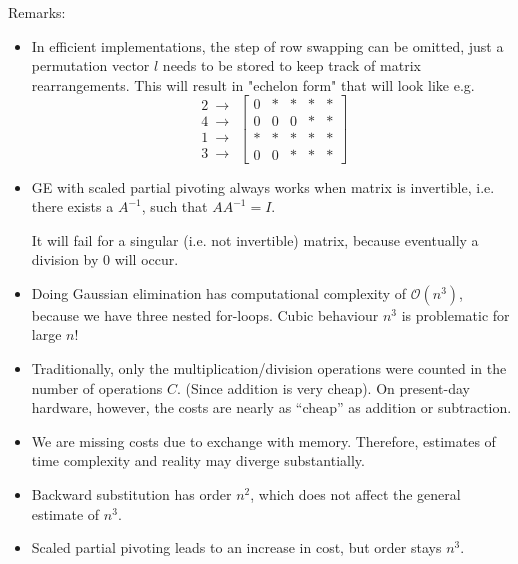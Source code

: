 Remarks:
\begin{itemize}
    \item {
        In efficient implementations, the step of row swapping can be omitted, just 
        a permutation vector $l$ needs to be stored to keep track of matrix
        rearrangements.
        This will result in "echelon form" that will look like e.g.
        \[
            \begin{array}{c}
                2\ \to\\
                4\ \to\\
                1\ \to\\
                3\ \to
            \end{array}
            \left[\begin{array}{cccc|c}
                0 & * & * & * & *\\
                0 & 0 & 0 & * & *\\
                * & * & * & * & *\\
                0 & 0 & * & * & *
            \end{array}\right]
        \]
    }
    \item {
        GE with scaled partial pivoting always works when matrix is invertible, i.e.
        there exists a $A^{-1}$, such that $A A^{-1} = I$.
    
        It will fail for a singular (i.e. not invertible) matrix,
        because eventually a division by 0 will occur.
    }
    \item {
        Doing Gaussian elimination has computational complexity
        of $\mathcal{O}(n^3)$, because we have three nested for-loops.
        Cubic behaviour $n^3$ is problematic for large $n$!
    }
    \item {
        Traditionally, only the multiplication/division operations
        were counted in the number of operations $C$.
        (Since addition is very cheap).
        On present-day hardware, however, the costs are nearly as ``cheap''
        as addition or subtraction.
    }
    \item { 
        We are missing costs due to exchange with memory.
        Therefore, estimates of time complexity and reality may
        diverge substantially. 
    }
    \item {
        Backward substitution has order $n^2$, which does not affect the general 
        estimate of $n^3$.
    }
    \item {
        Scaled partial pivoting leads to an increase in cost, but order stays $n^3$.
    }
\end{itemize}